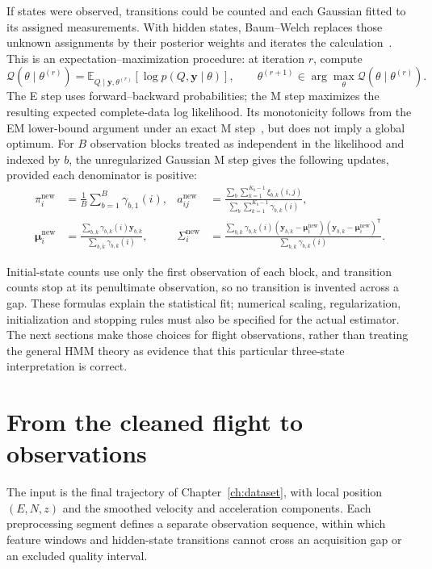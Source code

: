 If states were observed, transitions could be counted and each Gaussian fitted to its
assigned measurements. With hidden states, Baum--Welch replaces those unknown assignments
by their posterior weights and iterates the calculation~\cite{baum1970}. This is an
expectation--maximization procedure: at iteration $r$, compute
\begin{equation}
 \mathcal Q(\theta\mid\theta^{(r)})
 =\mathbb E_{Q\mid\mathbf y,\theta^{(r)}}
       [\log p(Q,\mathbf y\mid\theta)],
 \qquad
 \theta^{(r+1)}\in\arg\max_\theta\mathcal Q(\theta\mid\theta^{(r)}).
 \label{eq:hmm-em-objective}
\end{equation}
The E step uses forward--backward probabilities; the M step maximizes the resulting
expected complete-data log likelihood. Its monotonicity follows from the EM lower-bound
argument under an exact M step~\cite{dempster1977}, but does not imply a global optimum.
For $B$ observation blocks treated as independent in the likelihood and indexed by $b$, the unregularized Gaussian
M step gives the following updates, provided each denominator is positive:
\begin{align}
 \pi_i^{\mathrm{new}}&=\frac1B\sum_{b=1}^B\gamma_{b,1}(i),&
 a_{ij}^{\mathrm{new}}&=
 \frac{\sum_b\sum_{k=1}^{K_b-1}\xi_{b,k}(i,j)}
      {\sum_b\sum_{k=1}^{K_b-1}\gamma_{b,k}(i)},\label{eq:baumwelch}\\
 \boldsymbol\mu_i^{\mathrm{new}}&=
 \frac{\sum_{b,k}\gamma_{b,k}(i)\mathbf y_{b,k}}
      {\sum_{b,k}\gamma_{b,k}(i)},&
 \Sigma_i^{\mathrm{new}}&=
 \frac{\sum_{b,k}\gamma_{b,k}(i)
 (\mathbf y_{b,k}-\boldsymbol\mu_i^{\mathrm{new}})
 (\mathbf y_{b,k}-\boldsymbol\mu_i^{\mathrm{new}})^{\mathsf T}}
 {\sum_{b,k}\gamma_{b,k}(i)}.
 \label{eq:baumwelchcovariance}
\end{align}

Initial-state counts use only the first observation of each block, and transition counts
stop at its penultimate observation, so no transition is invented across a gap. These
formulas explain the statistical fit; numerical scaling, regularization, initialization
and stopping rules must also be specified for the actual estimator. The next sections
make those choices for flight observations, rather than treating the general HMM theory
as evidence that this particular three-state interpretation is correct.

\section{From the cleaned flight to observations}
\label{sec:phasefeatures}
The input is the final trajectory of Chapter~\ref{ch:dataset}, with local position
$(E,N,z)$ and the smoothed velocity and acceleration components. Each preprocessing
segment defines a separate observation sequence, within which feature windows and
hidden-state transitions cannot cross an acquisition gap or an excluded quality interval.

